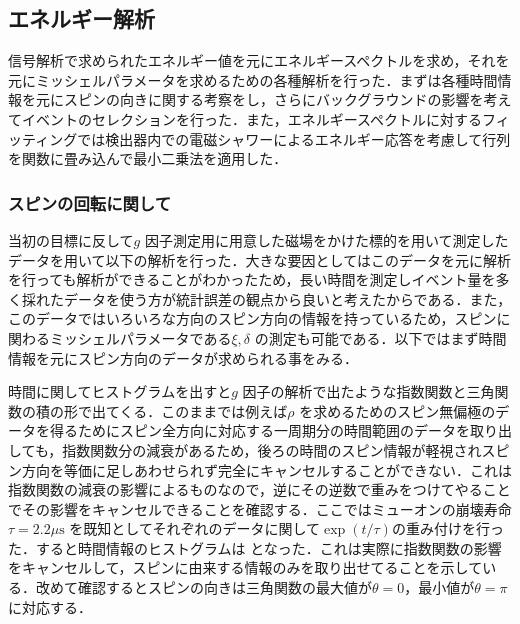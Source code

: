 %

\subsection{エネルギー解析}
信号解析で求められたエネルギー値を元にエネルギースペクトルを求め，それを元にミッシェルパラメータを求めるための各種解析を行った．まずは各種時間情報を元にスピンの向きに関する考察をし，さらにバックグラウンドの影響を考えてイベントのセレクションを行った．また，エネルギースペクトルに対するフィッティングでは検出器内での電磁シャワーによるエネルギー応答を考慮して行列を関数に畳み込んで最小二乗法を適用した．

\subsubsection{スピンの回転に関して}
当初の目標に反して$g$ 因子測定用に用意した磁場をかけた標的を用いて測定したデータを用いて以下の解析を行った．大きな要因としてはこのデータを元に解析を行っても解析ができることがわかったため，長い時間を測定しイベント量を多く採れたデータを使う方が統計誤差の観点から良いと考えたからである．また，このデータではいろいろな方向のスピン方向の情報を持っているため，スピンに関わるミッシェルパラメータである$\xi,\delta$ の測定も可能である．以下ではまず時間情報を元にスピン方向のデータが求められる事をみる．

時間に関してヒストグラムを出すと$g$ 因子の解析で出たような指数関数と三角関数の積の形で出てくる．このままでは例えば$\rho$ を求めるためのスピン無偏極のデータを得るためにスピン全方向に対応する一周期分の時間範囲のデータを取り出しても，指数関数分の減衰があるため，後ろの時間のスピン情報が軽視されスピン方向を等価に足しあわせられず完全にキャンセルすることができない．これは指数関数の減衰の影響によるものなので，逆にその逆数で重みをつけてやることでその影響をキャンセルできることを確認する．ここではミューオンの崩壊寿命$\tau=2.2\mu \mathrm{s}$ を既知としてそれぞれのデータに関して$\exp(t/\tau)$の重み付けを行った．すると時間情報のヒストグラムは となった．これは実際に指数関数の影響をキャンセルして，スピンに由来する情報のみを取り出せてることを示している．改めて確認するとスピンの向きは三角関数の最大値が$\theta=0$，最小値が$\theta=\pi$ に対応する．

